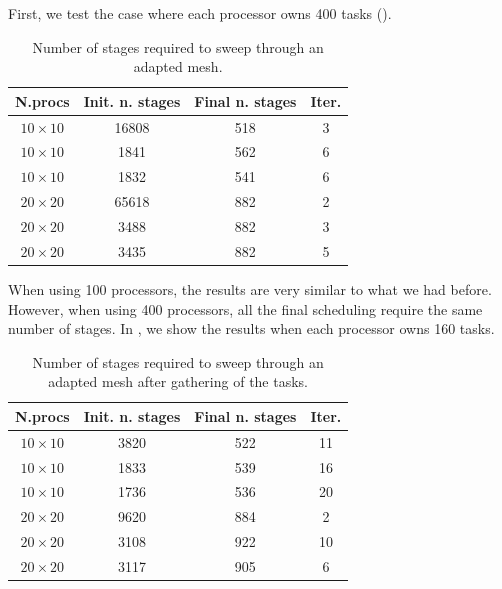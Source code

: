 \documentclass[letterpaper]{article}
\renewcommand{\(}{\left(}
\renewcommand{\)}{\right)}
\renewcommand{\[}{\left[}
\renewcommand{\]}{\right]}
\begin{document}
First, we test the case where each processor owns 400 tasks ().
\begin{table}[H]
  \begin{center}
    \begin{tabular}{|c|c|c|c|}
      \hline
      N.procs & Init. n. stages & Final n. stages & Iter. \\
      \hline
      $10 \times 10$ & 16808 & 518 & 3 \\
      $10 \times 10$ &  1841 & 562 & 6 \\
      $10 \times 10$ &  1832 & 541 & 6 \\
      $20 \times 20$ & 65618 & 882 & 2 \\
      $20 \times 20$ &  3488 & 882 & 3 \\
      $20 \times 20$ &  3435 & 882 & 5 \\
      \hline
    \end{tabular}
    \caption{Number of stages required to sweep through an adapted mesh.}
    \label{band_1}
  \end{center}
\end{table}

When using 100 processors, the results are very similar to what we had before.
However, when using 400 processors, all the final scheduling 
require the same number of stages. In , we show the results when
each processor owns 160 tasks.

\begin{table}[H]
  \begin{center}
    \begin{tabular}{|c|c|c|c|}
      \hline
      N.procs & Init. n. stages & Final n. stages & Iter. \\
      \hline
      $10 \times 10$ & 3820 & 522 & 11 \\
      $10 \times 10$ & 1833 & 539 & 16 \\
      $10 \times 10$ & 1736 & 536 & 20 \\
      $20 \times 20$ & 9620 & 884 & 2  \\
      $20 \times 20$ & 3108 & 922 & 10 \\
      $20 \times 20$ & 3117 & 905 & 6  \\
      \hline
    \end{tabular}
    \caption{Number of stages required to sweep through an adapted mesh after
    gathering of the tasks.}
    \label{band_2}
  \end{center}
\end{table}
\end{document}
